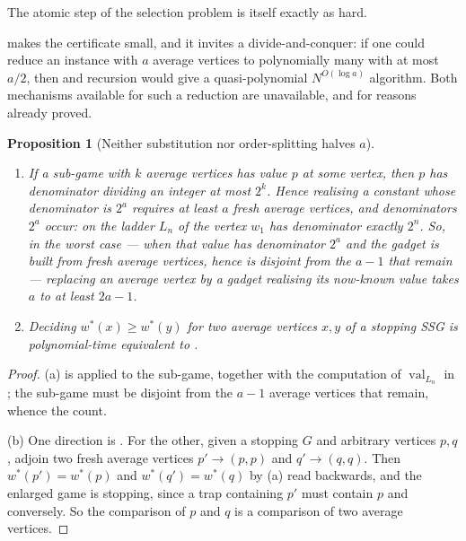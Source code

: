 \documentclass[11pt]{article}
\theoremstyle{plain}
\newtheorem{proposition}[theorem]{Proposition}
\theoremstyle{definition}
\DeclareMathOperator{\val}{val}
\begin{document}
The atomic step of the selection problem is itself exactly as hard.


 makes the certificate small, and it invites a
divide-and-conquer: if one could reduce an instance with $a$ average
vertices to polynomially many with at most $a/2$, then
 and recursion would give a quasi-polynomial
$N^{O(\log a)}$ algorithm. Both mechanisms available for such a reduction
are unavailable, and for reasons already proved.

\begin{proposition}[Neither substitution nor order-splitting halves
$a$]\label{prop:no-halving}
\begin{enumerate}[label=(\alph*),leftmargin=2.2em]
\item If a sub-game with $k$ average vertices has value $p$ at some
      vertex, then $p$ has denominator dividing an integer at most $2^{k}$.
      Hence realising a constant whose denominator is $2^{a}$ requires at
      least $a$ fresh average vertices, and denominators $2^{a}$ occur:
      on the ladder $L_n$ of  the vertex $w_1$ has
      denominator exactly $2^{n}$. So, in the worst case --- when that value has denominator
      $2^{a}$ and the gadget is built from fresh average vertices, hence
      is disjoint from the $a-1$ that remain --- replacing an average
      vertex by a gadget realising its now-known value takes $a$ to at
      least $2a-1$.
\item Deciding $w^\ast(x)\ge w^\ast(y)$ for two \emph{average} vertices
      $x,y$ of a stopping SSG is polynomial-time equivalent to
      .
\end{enumerate}
\end{proposition}

\begin{proof}
(a) is  applied to the sub-game, together
with the computation of $\val_{L_n}$ in ; the sub-game
must be disjoint from the $a-1$ average vertices that remain, whence the
count.

(b) One direction is . For the other,
given a stopping $G$ and arbitrary vertices $p,q$, adjoin two fresh
average vertices $p'\to(p,p)$ and $q'\to(q,q)$. Then
$w^\ast(p')=w^\ast(p)$ and $w^\ast(q')=w^\ast(q)$ by
(a) read backwards, and the enlarged game is stopping,
since a trap containing $p'$ must contain $p$ and conversely. So the
comparison of $p$ and $q$ is a comparison of two average vertices.
\end{proof}
\end{document}
